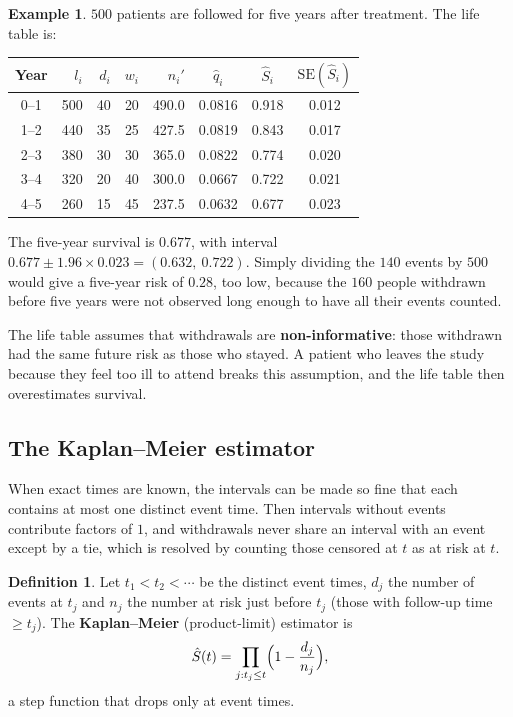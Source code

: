 \documentclass[11pt,a4paper]{article}
\numberwithin{equation}{section}
\theoremstyle{definition}
\newtheorem{defn}[thm]{Definition}
\newtheorem{exa}[thm]{Example}
\begin{document}
\begin{exa}
\label{exa:lifetable}
$500$ patients are followed for five years after treatment. The life table is:
\begin{center}
\begin{tabular}{crrrrccc}
\hline
Year & $l_i$ & $d_i$ & $w_i$ & $n_i'$ & $\hat q_i$ & $\hat S_i$ & $\text{SE}(\hat S_i)$ \\
\hline
0--1 & 500 & 40 & 20 & 490.0 & 0.0816 & 0.918 & 0.012 \\
1--2 & 440 & 35 & 25 & 427.5 & 0.0819 & 0.843 & 0.017 \\
2--3 & 380 & 30 & 30 & 365.0 & 0.0822 & 0.774 & 0.020 \\
3--4 & 320 & 20 & 40 & 300.0 & 0.0667 & 0.722 & 0.021 \\
4--5 & 260 & 15 & 45 & 237.5 & 0.0632 & 0.677 & 0.023 \\
\hline
\end{tabular}
\end{center}
The five-year survival is $0.677$, with interval $0.677 \pm 1.96 \times 0.023 = (0.632,\ 0.722)$. Simply dividing the $140$ events by $500$ would give a five-year
risk of $0.28$, too low, because the $160$ people withdrawn before five years were not observed long enough to have all their events counted.
\end{exa}

The life table assumes that withdrawals are \textbf{non-informative}: those withdrawn had the same future risk as those who stayed. A
patient who leaves the study because they feel too ill to attend breaks this assumption, and the life table then overestimates
survival.

\subsection{The Kaplan--Meier estimator}

When exact times are known, the intervals can be made so fine that each contains at most one distinct event time. Then
intervals without events contribute factors of $1$, and withdrawals never share an interval with an event except by a tie, which is
resolved by counting those censored at $t$ as at risk at $t$.

\begin{defn}
Let $t_1 < t_2 < \cdots$ be the distinct event times, $d_j$ the number of events at $t_j$ and $n_j$ the number at risk just before $t_j$ (those with
follow-up time $\geq t_j$). The \textbf{Kaplan--Meier} (product-limit) estimator is
\[
\hat S(t) = \prod_{j: t_j \leq t}\Bigl(1 - \frac{d_j}{n_j}\Bigr) ,
\]
a step function that drops only at event times.
\end{defn}
\end{document}
